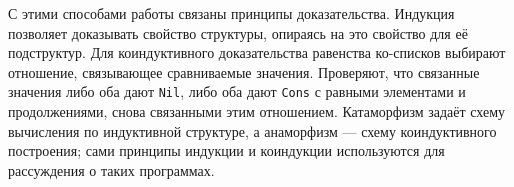 С этими способами работы связаны принципы доказательства.
Индукция позволяет доказывать свойство структуры, опираясь на это свойство для её подструктур.
Для коиндуктивного доказательства равенства ко-списков выбирают отношение, связывающее сравниваемые значения.
Проверяют, что связанные значения либо оба дают \texttt{Nil}, либо оба дают \texttt{Cons} с равными элементами и продолжениями, снова связанными этим отношением.
Катаморфизм задаёт схему вычисления по индуктивной структуре, а анаморфизм --- схему коиндуктивного построения; сами принципы индукции и коиндукции используются для рассуждения о таких программах.









